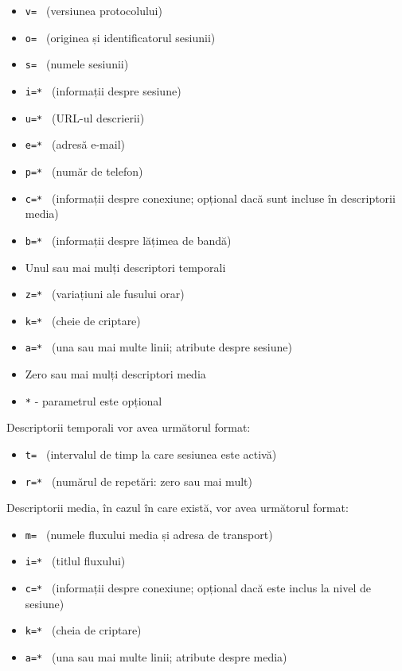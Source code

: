 \begin{itemize}
    \setlength{\itemsep}{-0.5em}
    \item \texttt{v=  } (versiunea protocolului)
    \item \texttt{o=  } (originea și identificatorul sesiunii)
    \item \texttt{s=  } (numele sesiunii)
    \item \texttt{i=* } (informații despre sesiune)
    \item \texttt{u=* } (URL-ul descrierii)
    \item \texttt{e=* } (adresă e-mail)
    \item \texttt{p=* } (număr de telefon)
    \item \texttt{c=* } (informații despre conexiune; opțional dacă sunt incluse în descriptorii media)
    \item \texttt{b=* } (informații despre lățimea de bandă)
    \item Unul sau mai mulți descriptori temporali
    \item \texttt{z=* } (variațiuni ale fusului orar)
    \item \texttt{k=* } (cheie de criptare)
    \item \texttt{a=* } (una sau mai multe linii; atribute despre sesiune)
    \item Zero sau mai mulți descriptori media
    \setlength{\itemsep}{0em} 
    \item[] \texttt{*} - parametrul este opțional
\end{itemize}
\indent \par Descriptorii temporali vor avea următorul format:
\begin{itemize}
    \setlength{\itemsep}{-0.5em}
    \item \texttt{t=  } (intervalul de timp la care sesiunea este activă)
    \item \texttt{r=* } (numărul de repetări: zero sau mai mult)
\end{itemize}
\indent \par Descriptorii media, în cazul în care există, vor avea următorul format:
\begin{itemize}
    \setlength{\itemsep}{-0.5em}
    \item \texttt{m=  } (numele fluxului media și adresa de transport)
    \item \texttt{i=* } (titlul fluxului)
    \item \texttt{c=* } (informații despre conexiune; opțional dacă este inclus la nivel de sesiune)
    \item \texttt{k=* } (cheia de criptare)
    \item \texttt{a=* } (una sau mai multe linii; atribute despre media)
\end{itemize}
